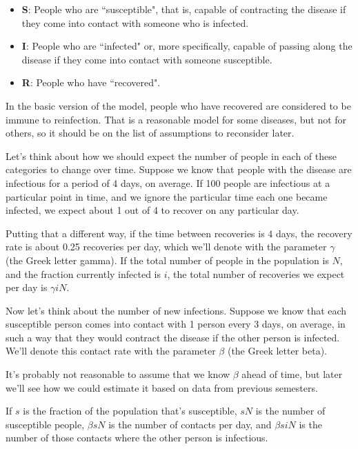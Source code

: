 \documentclass[12pt]{book}
\theoremstyle{exercise}
\begin{document}
\begin{itemize}

\item {\bf S}: People who are ``susceptible", that is, capable of contracting the disease if they come into contact with someone who is infected.

\item {\bf I}: People who are ``infected" or, more specifically, capable of passing along the disease if they come into contact with someone susceptible.

\item {\bf R}: People who have ``recovered".

\end{itemize}
  
In the basic version of the model, people who have recovered are considered to be immune to reinfection.  That is a reasonable model for some diseases, but not for others, so it should be on the list of assumptions to reconsider later.

Let's think about how we should expect the number of people in each of these categories to change over time.  Suppose we know that people with the disease are infectious for a period of 4 days, on average.  If 100 people are infectious at a particular point in time, and we ignore the particular time each one became infected, we expect about 1 out of 4 to recover on any particular day.

Putting that a different way, if the time between recoveries is 4 days, the recovery rate is about 0.25 recoveries per day, which we'll denote with the parameter $\gamma$ (the Greek letter gamma).  If the total number of people in the population is $N$, and the fraction currently infected is $i$, the total number of recoveries we expect per day is $\gamma i N$.

Now let's think about the number of new infections.  Suppose we know that each susceptible person comes into contact with 1 person every 3 days, on average, in such a way that they would contract the disease if the other person is infected.  We'll denote this contact rate with the parameter $\beta$ (the Greek letter beta).

It's probably not reasonable to assume that we know $\beta$ ahead of time, but later we'll see how we could estimate it based on data from previous semesters.

If $s$ is the fraction of the population that's susceptible, $s N$ is the number of susceptible people, $\beta s N$ is the number of contacts per day, and $\beta s i N$ is the number of those contacts where the other person is infectious.
\end{document}
